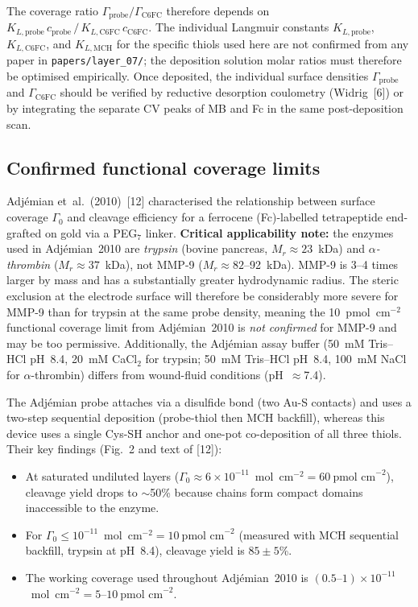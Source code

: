 \documentclass[10pt,a4paper]{article}
\numberwithin{equation}{section}
\newcommand{\cit}[1]{[#1]}   %
\begin{document}
The coverage ratio $\Gamma_{\text{probe}}/\Gamma_{\text{C6FC}}$ therefore depends on
$K_{L,\text{probe}}\,c_{\text{probe}}\,/\,K_{L,\text{C6FC}}\,c_{\text{C6FC}}$.
The individual Langmuir constants $K_{L,\text{probe}}$, $K_{L,\text{C6FC}}$, and
$K_{L,\text{MCH}}$ for the specific thiols used here are not confirmed from any paper in
\texttt{papers/layer\_07/}; the deposition solution molar ratios must therefore be
optimised empirically. Once deposited, the individual surface densities
$\Gamma_{\text{probe}}$ and $\Gamma_{\text{C6FC}}$ should be verified by reductive
desorption coulometry (Widrig~\cit{6}) or by integrating the separate CV peaks of MB
and Fc in the same post-deposition scan.

\subsection{Confirmed functional coverage limits}

Adj\'{e}mian et~al.\ (2010)~\cit{12} characterised the relationship between surface
coverage $\Gamma_0$ and cleavage efficiency for a ferrocene (Fc)-labelled tetrapeptide
end-grafted on gold via a PEG$_7$ linker. \textbf{Critical applicability note:} the
enzymes used in Adj\'{e}mian~2010 are \emph{trypsin} (bovine pancreas, $M_r \approx
23$~kDa) and \emph{$\alpha$-thrombin} ($M_r \approx 37$~kDa), not MMP-9 ($M_r \approx
82$--92~kDa). MMP-9 is 3--4 times larger by mass and has a substantially greater
hydrodynamic radius. The steric exclusion at the electrode surface will therefore be
considerably more severe for MMP-9 than for trypsin at the same probe density, meaning
the 10~pmol~cm$^{-2}$ functional coverage limit from Adj\'{e}mian~2010 is \emph{not
confirmed} for MMP-9 and may be too permissive. Additionally, the Adj\'{e}mian assay
buffer (50~mM Tris--HCl pH~8.4, 20~mM CaCl$_2$ for trypsin; 50~mM Tris--HCl pH~8.4,
100~mM NaCl for $\alpha$-thrombin) differs from wound-fluid conditions (pH~$\approx$7.4).

The Adj\'{e}mian probe attaches via a disulfide bond (two Au-S contacts) and uses a
two-step sequential deposition (probe-thiol then MCH backfill), whereas this device uses
a single Cys-SH anchor and one-pot co-deposition of all three thiols. Their key findings
(Fig.~2 and text of \cit{12}):

\begin{itemize}[noitemsep]
  \item At saturated undiluted layers ($\Gamma_0 \approx 6 \times 10^{-11}$~mol~cm$^{-2}
    = 60\ \text{pmol~cm}^{-2}$), cleavage yield drops to $\sim$50\% because chains form
    compact domains inaccessible to the enzyme.
  \item For $\Gamma_0 \leq 10^{-11}$~mol~cm$^{-2} = 10\ \text{pmol~cm}^{-2}$
    (measured with MCH sequential backfill, trypsin at pH~8.4), cleavage yield is
    $85 \pm 5$\%.
  \item The working coverage used throughout Adj\'{e}mian~2010 is
    $(0.5\text{--}1) \times 10^{-11}$~mol~cm$^{-2} = 5\text{--}10\ \text{pmol~cm}^{-2}$.
\end{itemize}
\end{document}
